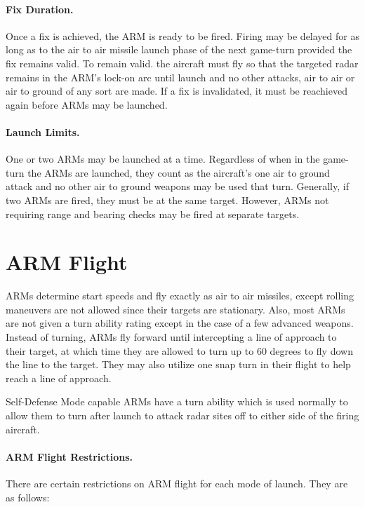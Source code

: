 \paragraph{Fix Duration.} Once a fix is achieved, the ARM is ready to be fired. Firing may be delayed for as long as to the air to air missile launch phase of the next game-turn provided the fix remains valid. To remain valid. the aircraft must fly so that the targeted radar remains in the ARM's lock-on arc until launch and no other attacks, air to air or air to ground of any sort are made. If a fix is invalidated, it must be reachieved again before ARMs may be launched.

\paragraph{Launch Limits.} One or two ARMs may be launched at a time.  Regardless of when in the game-turn the ARMs are launched, they count as the aircraft's one air to ground attack and no other air to ground weapons may be used that turn. Generally, if two ARMs are fired, they must be at the same target. However, ARMs not requiring range and bearing checks may be fired at separate targets.

\section{ARM Flight}

ARMs determine start speeds and fly exactly as air to air missiles, except rolling maneuvers are not allowed since their targets are stationary. Also, most ARMs are not given a turn ability rating except in the case of a few advanced weapons. Instead of turning, ARMs fly forward until intercepting a line of approach to their target, at which time they are allowed to turn up to 60 degrees to fly down the line to the target. They may also utilize one snap turn in their flight to help reach a line of approach.

Self-Defense Mode capable ARMs have a turn ability which is used normally to allow them to turn after launch to attack radar sites off to either side of the firing aircraft.

\paragraph{ARM Flight Restrictions.} There are certain restrictions on ARM flight for each mode of launch. They are as follows:

